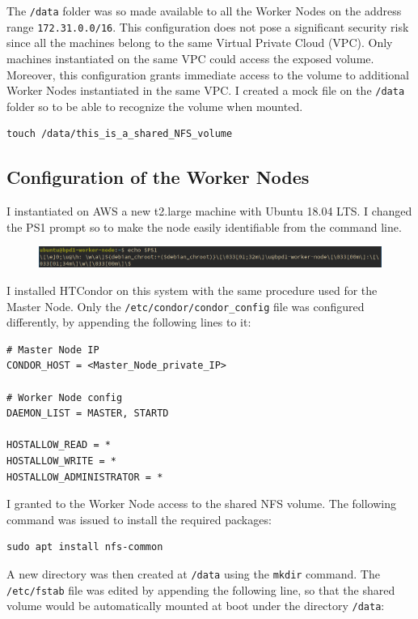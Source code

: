 \documentclass{article}
\begin{document}
The \texttt{/data} folder was so made available to all the Worker Nodes on the address range \texttt{172.31.0.0/16}.
This configuration does not pose a significant security risk since all the machines belong to the same Virtual Private Cloud (VPC). Only machines instantiated on the same VPC could access the exposed volume.
Moreover, this configuration grants immediate access to the volume to additional Worker Nodes instantiated in the same VPC.
I created a mock file on the \texttt{/data} folder so to be able to recognize the volume when mounted.

\begin{lstlisting}
touch /data/this_is_a_shared_NFS_volume
\end{lstlisting}

\subsection{Configuration of the Worker Nodes}
I instantiated on AWS a new t2.large machine with Ubuntu 18.04 LTS.
I changed the PS1 prompt so to make the node easily identifiable from the command line.

\begin{figure}[!h]
    \center
    \includegraphics[width=\textwidth]{./images/worker-ps1.png}
\end{figure}

I installed HTCondor on this system with the same procedure used for the Master Node.
Only the \texttt{/etc/condor/condor\_config} file was configured differently, by appending the following lines to it:

\begin{lstlisting}
# Master Node IP
CONDOR_HOST = <Master_Node_private_IP>

# Worker Node config
DAEMON_LIST = MASTER, STARTD

HOSTALLOW_READ = *
HOSTALLOW_WRITE = *
HOSTALLOW_ADMINISTRATOR = *
\end{lstlisting}

I granted to the Worker Node access to the shared NFS volume.
The following command was issued to install the required packages:

\begin{lstlisting}
sudo apt install nfs-common
\end{lstlisting}

A new directory was then created at \texttt{/data} using the \texttt{mkdir} command.
The \texttt{/etc/fstab} file was edited by appending the following line, so that the shared volume would be automatically mounted at boot under the directory \texttt{/data}:
\end{document}
